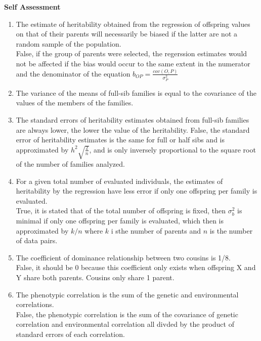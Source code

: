 \documentclass[12pt]{amsart}
\begin{document}
{\large \bf Self Assessment}
\begin{enumerate}
\item The estimate of heritability obtained from the regression of offspring values on that of their parents will necessarily be biased if the latter are not a random sample of the population.\\
False, if the group of parents were selected, the regerssion estimates would not be affected if the bias would occur to the same extent in the numerator and the denominator of the equation $b_{OP} = \frac{cov(O,P)}{\sigma^2_P}$\\

\item The variance of the means of full-sib families is equal to the covariance of the values of the members of the families.\\

\item The standard errors of heritability estimates obtained from full-sib families are always lower, the lower the value of the heritability.
False, the standard error of heritability estimates is the same for full or half sibs and is approximated by $h^2\sqrt{\frac{2}{n}}$, and is only inversely proportional to the square root of  the number of families analyzed.

\item For a given total number of evaluated individuals, the estimates of heritability by the regression have less error if only one offspring per family is evaluated.\\
True, it is stated that of the total number of offspring is fixed, then $\sigma^2_b$ is minimal if only one offspring per family is evaluated, which then is approximated by $k/n$ where $k$ i sthe number of parents and $n$ is the number of data pairs. \\

\item The coefficient of dominance relationship between two cousins is 1/8.\\
False, it should be 0 because this coefficient only exists when offspring X and Y share both parents. Cousins only share 1 parent.\\ 

\item The phenotypic correlation is the sum of the genetic and environmental correlations.\\
False, the phenotypic correlation is the sum of the covariance of genetic correlation and environmental correlation all divded by the product of standard errors of each correlation.\\


\end{enumerate}
\end{document}
